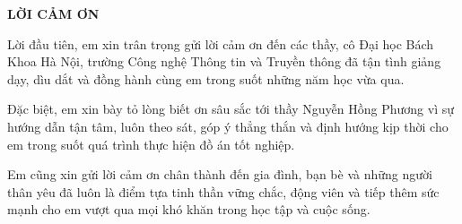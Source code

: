 \documentclass[../DoAn.tex]{subfiles}
\begin{document}
\begin{center}
    \Large{\textbf{LỜI CẢM ƠN}}\\
\end{center}
\vspace{1cm}

Lời đầu tiên, em xin trân trọng gửi lời cảm ơn đến các thầy, cô Đại học Bách Khoa
Hà Nội, trường Công nghệ Thông tin và Truyền thông đã tận tình giảng dạy, dìu dắt và đồng hành cùng em trong suốt những năm học vừa qua.

Đặc biệt, em xin bày tỏ lòng biết ơn sâu sắc tới thầy Nguyễn Hồng Phương vì sự
hướng dẫn tận tâm, luôn theo sát, góp ý thẳng thắn và định hướng kịp thời cho em trong suốt quá trình thực hiện đồ án tốt nghiệp.

Em cũng xin gửi lời cảm ơn chân thành đến gia đình, bạn bè và những người
thân yêu  đã luôn là điểm tựa tinh thần vững chắc, động viên và tiếp
thêm sức mạnh cho em vượt qua mọi khó khăn trong học tập và cuộc sống.
\end{document}
